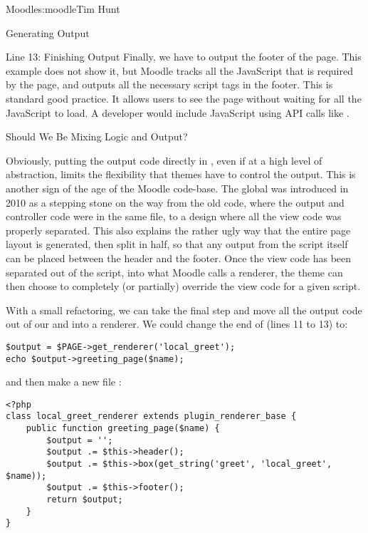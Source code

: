 \begin{aosachapter}{Moodle}{s:moodle}{Tim Hunt}
\begin{aosasect1}{Generating Output}
\begin{aosasect2}{Line 13: Finishing Output}
Finally, we have to output the footer of the page. This example does
not show it, but Moodle tracks all the JavaScript that is required by
the page, and outputs all the necessary script tags in the
footer. This is standard good practice. It allows users to see the
page without waiting for all the JavaScript to load. A developer would
include JavaScript using API calls like
.

\end{aosasect2}

\begin{aosasect2}{Should We Be Mixing Logic and Output?}

Obviously, putting the output code directly in , even
if at a high level of abstraction, limits the flexibility that themes
have to control the output. This is another sign of the age of the
Moodle code-base. The  global was introduced in 2010 as
a stepping stone on the way from the old code, where the output and
controller code were in the same file, to a design where all the view
code was properly separated. This also explains the rather ugly way
that the entire page layout is generated, then split in half, so that
any output from the script itself can be placed between the header and
the footer. Once the view code has been separated out of the script,
into what Moodle calls a renderer, the theme can then choose to
completely (or partially) override the view code for a given script.

With a small refactoring, we can take the final step and move all the
output code out of our  and into a renderer. We could change
the end of  (lines 11 to 13) to:

\begin{verbatim}
$output = $PAGE->get_renderer('local_greet');
echo $output->greeting_page($name);
\end{verbatim}

\noindent and then make a new file :

\begin{verbatim}
<?php
class local_greet_renderer extends plugin_renderer_base {
    public function greeting_page($name) {
        $output = '';
        $output .= $this->header();
        $output .= $this->box(get_string('greet', 'local_greet', $name));
        $output .= $this->footer();
        return $output;
    }
}
\end{verbatim}


\end{aosasect2}
\end{aosasect1}
\end{aosachapter}
